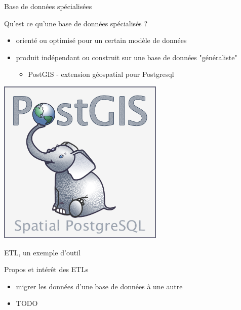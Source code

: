 {  \begin{frame}{Base de données spécialisées}
    \begin{block}{Qu'est ce qu'une base de données spécialisés ?}
      \begin{itemize}
        \item orienté ou optimisé pour un certain modèle de données
        \item produit indépendant ou construit sur une base de données "généraliste"
        \begin{itemize}
         \item PostGIS - extension géospatial pour Postgresql
        \end{itemize}
      \end{itemize}
    \end{block}
    \begin{center}
      \includegraphics[scale=0.4]{../img/PostGIS-database.png}
    \end{center}
  \end{frame}

  \begin{frame}{ETL, un exemple d'outil}
    \begin{block}{Propos et intérêt des ETLs}
      \begin{itemize}
        \item migrer les données d'une base de données à une autre
        \item TODO
      \end{itemize}
    \end{block}
  \end{frame}
}
